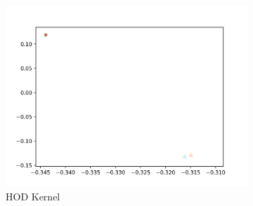\documentclass[10pt]{article}
\begin{document}
\begin{figure}[H]
    \begin{subfigure}[h]{0.3\textwidth}
        \includegraphics[width=\linewidth]{ms_hod}
        \caption{HOD Kernel}
    \end{subfigure}%
    \begin{subfigure}[h]{0.08\textwidth}

\end{subfigure}
\end{figure}
\end{document}
